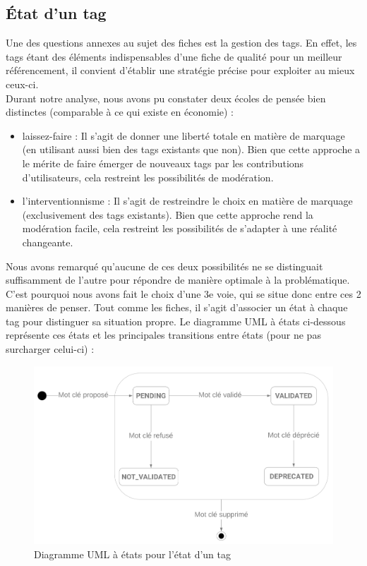 \subsection*{État d'un \gls{tag}}

Une des questions annexes au sujet des \glspl{fiche} est la gestion des \glspl{tag}. En effet, les \glspl{tag} étant des éléments indispensables d'une \gls{fiche} de qualité pour un meilleur référencement, il convient d'établir une stratégie précise pour exploiter au mieux ceux-ci. \\

Durant notre analyse, nous avons pu constater deux écoles de pensée bien distinctes (comparable à ce qui existe en économie) : 
\begin{itemize}
    \item laissez-faire : Il s'agit de donner une liberté totale en matière de marquage (en utilisant aussi bien des \glspl{tag} existants que non). Bien que cette approche a le mérite de faire émerger de nouveaux \glspl{tag} par les contributions d'utilisateurs, cela restreint les possibilités de modération.
    \item l'interventionnisme : Il s'agit de restreindre le choix en matière de marquage (exclusivement des \glspl{tag} existants). Bien que cette approche rend la modération facile, cela restreint les possibilités de s'adapter à une réalité changeante.
\end{itemize}

Nous avons remarqué qu'aucune de ces deux possibilités ne se distinguait suffisamment de l'autre pour répondre de manière optimale à la problématique.
C'est pourquoi nous avons fait le choix d'une 3e voie, qui se situe donc entre ces 2 manières de penser. Tout comme les \glspl{fiche}, il s'agit d'associer un état à chaque \gls{tag} pour distinguer sa situation propre. Le diagramme UML à états ci-dessous représente ces états et les principales transitions entre états (pour ne pas surcharger celui-ci) :

\begin{figure}[H]
    \includegraphics[width=\textwidth,height=\textheight,keepaspectratio]{images/StateTags.png}
    \centering
    \caption{Diagramme UML à états pour l'état d'un \gls{tag}}
    \label{pic:stateDiagramForTags}
\end{figure}


